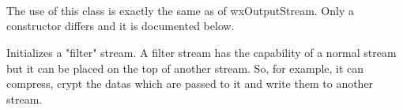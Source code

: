 \section{}\label{wxfilteroutputstream}


\\


The use of this class is exactly the same as of wxOutputStream. Only a constructor
differs and it is documented below.



Initializes a "filter" stream. A filter stream has the capability of a normal
stream but it can be placed on the top of another stream. So, for example, it
can compress, crypt the datas which are passed to it and write them to another
stream.
